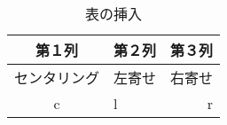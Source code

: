 \documentclass{jarticle}
\begin{document}
\begin{table}
   
    \centering
    \caption{表の挿入}
    \label{tab:hogehoge}
    \begin {tabular}{clr}
        \hline
        第１列 & 第２列 & 第３列 \\ \hline 
        センタリング & 左寄せ & 右寄せ \\
        c & l & r \\ \hline
    \end{tabular}
    
\end{table}
\end{document}
